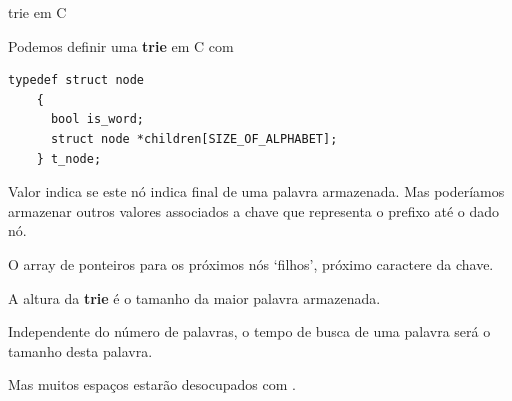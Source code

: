 \documentclass{beamer}
\begin{document}
\begin{frame}{trie em C}
  
  Podemos definir uma \textbf{trie} em C com

  \begin{lstlisting}[style=normalc]
    typedef struct node
    {
      bool is_word;
      struct node *children[SIZE_OF_ALPHABET];
    } t_node;
  \end{lstlisting}

  Valor  indica se este nó indica final de uma palavra
  armazenada. Mas poderíamos armazenar outros valores associados a
  chave que representa o prefixo até o dado nó.

  O array de ponteiros para os próximos nós `filhos', próximo
  caractere da chave.

  \framebreak

  A altura da \textbf{trie} é o tamanho da maior palavra armazenada.

  Independente do número de palavras, o tempo de busca de uma palavra
  será o tamanho desta palavra.

  Mas muitos espaços estarão desocupados com .
  
\end{frame}
\end{document}
